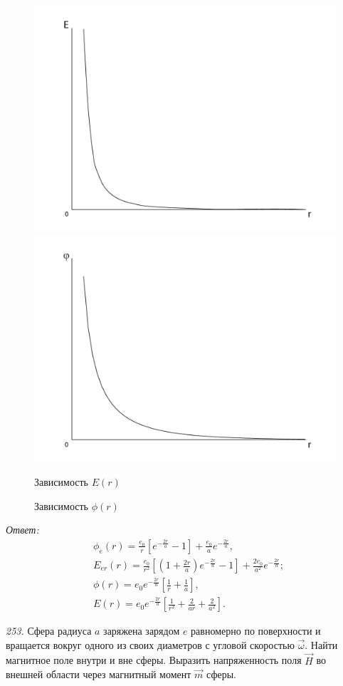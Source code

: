    \begin{figure}
        \center
        \includegraphics[width=.47\textwidth]{field}\hfill
        \includegraphics[width=.47\textwidth]{potential}
        \parbox{.47\textwidth}{\centering Зависимость \( E(r) \)}\hfill
        \parbox{.47\textwidth}{\centering Зависимость \( \phi(r) \)}
    \end{figure}

\vspace*{2em}        
\emph{Ответ:}
    \begin{align*}
        & \phi_e(r) = \frac{e_0}{r}\left[e^{-\frac{2r}{a}} - 1\right] +
        \frac{e_0}{a}e^{-\frac{2r}{a}}, \\
        & E_{er}(r) = \frac{e_0}{r^2}\left[\left(1 + \frac{2r}{a}\right)
        e^{-\frac{2r}{a}} - 1\right] + \frac{2e_0}{a^2}e^{-\frac{2r}{a}}; \\
        & \phi(r) = e_0e^{-\frac{2r}{a}}\left[\frac{1}{r} + \frac{1}{a}\right], \\
        & E(r) = e_0e^{-\frac{2r}{a}}\left[\frac{1}{r^2} + \frac{2}{ar} +
        \frac{2}{a^2}\right].
    \end{align*}

\newpage
\emph{253.} Сфера радиуса \( a \) заряжена зарядом \( e \) равномерно по
поверхности и вращается вокруг одного из своих диаметров с угловой скоростью
\( \vec{\omega} \). Найти магнитное поле внутри и вне сферы. Выразить
напряженность поля \( \vec{H} \) во внешней области через магнитный момент
\( \vec{m} \) сферы.


